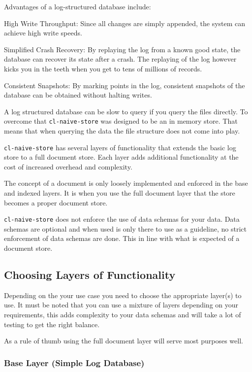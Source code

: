 \documentclass[11pt]{article}
\begin{document}
Advantages of a log-structured database include:

High Write Throughput: Since all changes are simply appended, the
system can achieve high write speeds.

Simplified Crash Recovery: By replaying the log from a known good
state, the database can recover its state after a crash. The replaying
of the log however kicks you in the teeth when you get to tens of
millions of records.

Consistent Snapshots: By marking points in the log, consistent
snapshots of the database can be obtained without halting writes.

A log structured database can be slow to query if you query the files
directly. To overcome that \texttt{cl-naive-store} was designed to be an in
memory store. That means that when querying the data the file
structure does not come into play.

\texttt{cl-naive-store} has several layers of functionality that extends the
basic log store to a full document store. Each layer adds additional
functionality at the cost of increased overhead and complexity.

The concept of a document is only loosely implemented and enforced in
the base and indexed layers. It is when you use the full document
layer that the store becomes a proper document store.

\texttt{cl-naive-store} does not enforce the use of data schemas for your
data. Data schemas are optional and when used is only there to use as
a guideline, no strict enforcement of data schemas are done. This in
line with what is expected of a document store.

\subsection{Choosing Layers of Functionality}
\label{sec:org6c1e1fe}

Depending on the your use case you need to choose the appropriate
layer(s) to use. It must be noted that you can use a mixture of layers
depending on your requirements, this adds complexity to your data
schemas and will take a lot of testing to get the right balance.

As a rule of thumb using the full document layer will serve most
purposes well.

\subsubsection{Base Layer (Simple Log Database)}
\label{sec:orgc97c47c}
\end{document}
